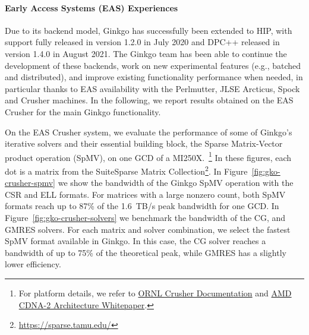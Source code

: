 \paragraph{Early Access Systems (EAS) Experiences}
Due to its backend model, Ginkgo has successfully been extended to HIP, with
support fully released in version 1.2.0 in July 2020 and DPC++ released in
version 1.4.0 in August 2021. The Ginkgo team has been able to continue the
development of these backends, work on new experimental features (e.g., batched
and distributed), and improve existing functionality performance when needed, in
particular thanks to EAS availability with the Perlmutter, JLSE Arcticus, Spock
and Crusher machines. In the following, we report results obtained on the EAS
Crusher for the main Ginkgo functionality.

On the EAS Crusher system, we evaluate the performance of some of Ginkgo's
iterative solvers and their essential building block, the Sparse Matrix-Vector
product operation (SpMV), on one GCD of a MI250X.~\footnote{For platform
  details, we refer to
  \href{https://docs.olcf.ornl.gov/systems/crusher_quick_start_guide.html}{ORNL
    Crusher Documentation} and
  \href{https://www.amd.com/system/files/documents/amd-cdna2-white-paper.pdf}{AMD
    CDNA-2 Architecture Whitepaper}.} In these figures, each dot is a matrix
from the SuiteSparse Matrix Collection\footnote{\url{https://sparse.tamu.edu/}}.
In Figure~\ref{fig:gko-crusher-spmv} we show the bandwidth of the Ginkgo SpMV
operation with the CSR and ELL formats. For matrices with a large nonzero count,
both SpMV formats reach up to 87\% of the 1.6~TB/s peak bandwidth for one GCD.
In Figure~\ref{fig:gko-crusher-solvers} we benchmark the bandwidth of the CG,
and GMRES solvers. For each matrix and solver combination, we select the fastest
SpMV format available in Ginkgo. In this case, the CG solver reaches a bandwidth
of up to 75\% of the theoretical peak, while GMRES has a slightly lower
efficiency.



